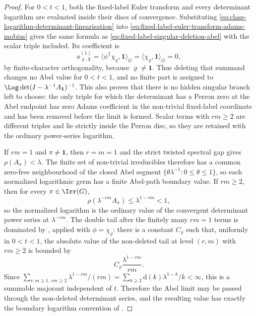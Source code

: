\begin{proof}
  For \(0<t<1\), both the fixed-label Euler transform and every determinant
  logarithm are evaluated inside their discs of convergence. Substituting
  \eqref{eq:class-logarithm-determinant-linearisation} into
  \eqref{eq:fixed-label-euler-transform-adams-mobius} gives the same
  formula as \eqref{eq:fixed-label-singular-deletion-abel} with the scalar
  triple included.  Its coefficient is
  \[
    a_{\varrho,\mathbf1}^{(1)}
    =\langle\psi^1\chi_\varrho,\mathbf1\rangle_G
    =\langle\chi_\varrho,\mathbf1\rangle_G=0,
  \]
  by finite-character orthogonality, because \(\varrho\neq\mathbf1\).
  Thus deleting that summand changes no Abel value for \(0<t<1\), and no
  finite part is assigned to
  \(\Log\det(I-\lambda^{-1}A_{\mathbf1})^{-1}\).
  This also proves that there is no hidden singular branch left to choose:
  the only triple for which the determinant has a Perron zero at the Abel
  endpoint has zero Adams coefficient in the non-trivial fixed-label
  coordinate and has been removed before the limit is formed.  Scalar terms
  with \(rm\ge2\) are different triples and lie strictly inside the Perron
  disc, so they are retained with the ordinary power-series logarithm.

  If \(rm=1\) and \(\pi\neq\mathbf1\), then \(r=m=1\) and the strict twisted
  spectral gap gives \(\rho(A_\pi)<\lambda\).  The finite set of non-trivial
  irreducibles therefore has a common zero-free neighbourhood of the closed
  Abel segment \(\{\theta\lambda^{-1}:0\le\theta\le1\}\), so each normalized
  logarithmic germ has a finite Abel-path boundary value. If \(rm\ge2\), then
  for every \(\pi\in\Irr(G)\),
  \[
    \rho(\lambda^{-rm}A_\pi)
    \le \lambda^{1-rm}<1,
  \]
  so the normalized logarithm is the ordinary value of the convergent
  determinant power series at \(\lambda^{-rm}\).  The double tail after the
  finitely many \(rm=1\) terms is dominated by
  , applied with
  \(\phi=\chi_\varrho\): there is a constant \(C_\varrho\) such that, uniformly
  in \(0<t<1\), the absolute value of the non-deleted tail at level \((r,m)\)
  with \(rm\ge2\) is bounded by
  \[
    C_\varrho\frac{\lambda^{1-rm}}{rm}.
  \]
  Since
  \(\sum_{r,m\ge1,\,rm\ge2}\lambda^{1-rm}/(rm)
    =\sum_{k\ge2}\mathrm d(k)\lambda^{1-k}/k<\infty\), this is a summable
  majorant independent of \(t\).  Therefore the Abel limit may be passed
  through the non-deleted determinant series, and the resulting value has
  exactly the boundary logarithm convention of
  .
\end{proof}

